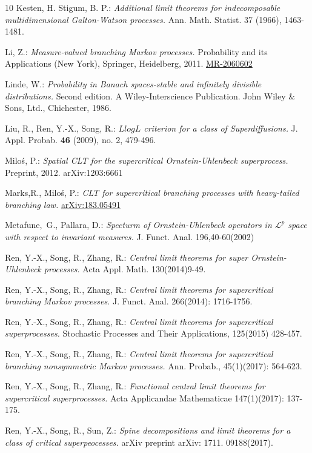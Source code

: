 \documentclass[12pt,a4paper]{amsart}
\def\MR#1{\href{http://www.ams.org/mathscinet-getitem?mr=#1}{MR-#1}}
\def\ARXIV#1{\href{https://arxiv.org/abs/#1}{arXiv:#1}}
\theoremstyle{plain}
\theoremstyle{definition}
\numberwithin{equation}{section}
\begin{document}
\begin{thebibliography} {10}
Kesten, H. Stigum, B. P.:
\emph{Additional limit theorems for indecomposable multidimensional Galton-Watson processes.}
Ann. Math. Statist. 37 (1966), 1463-1481.

Li, Z.:
\emph{Measure-valued branching Markov processes.}
Probability and its Applications (New York), Springer, Heidelberg, 2011.
\MR{2060602}

Linde, W.:
\emph{Probability in Banach spaces-stable and infinitely divisible distributions.}
Second edition. A Wiley-Interscience Publication. John Wiley \& Sons, Ltd., Chichester, 1986.

Liu, R., Ren, Y.-X., Song, R.:
\emph{{$L log L$} criterion for a class of Superdiffusions.}
J. Appl. Probab. \textbf{46} (2009), no. 2, 479-496.

Milo\'s, P.:
\emph{Spatial CLT for the supercritical Ornstein-Uhlenbeck superprocess.}
Preprint, 2012. arXiv:1203:6661

Marks,R., Milo\'s, P.:
\emph{CLT for supercritical branching processes with heavy-tailed branching law.}
\ARXIV{183.05491}

Metafune,~G., Pallara, D.:
\emph{Specturm of Ornstein-Uhlenbeck operators in $\mathcal{L}^p$ space with respect to invariant measures.}
J. Funct. Anal. 196,40-60(2002)

Ren, Y.-X., Song, R., Zhang, R.:
\emph{Central limit theorems for super Ornstein-Uhlenbeck processes.}
Acta Appl. Math. 130(2014)9-49.

Ren, Y.-X., Song, R., Zhang, R.:
\emph{Central limit theorems for supercritical branching Markov processes.}
J. Funct. Anal. 266(2014): 1716-1756.

Ren, Y.-X., Song, R., Zhang, R.:
\emph{Central limit theorems for supercritical superprocesses.}
Stochastic Processes and Their Applications, 125(2015) 428-457.

Ren, Y.-X., Song, R., Zhang, R.:
\emph{Central limit theorems for supercritical branching nonsymmetric Markov processes.}
Ann. Probab., 45(1)(2017): 564-623.

Ren, Y.-X., Song, R., Zhang, R.:
\emph{Functional central limit theorems for supercritical superprocesses.}
Acta Applicandae Mathematicae 147(1)(2017): 137-175.

Ren, Y.-X., Song, R., Sun, Z.:
\emph{ Spine decompositions and limit theorems for a class of critical superpeocesses.}
arXiv preprint arXiv: 1711. 09188(2017).


\end{thebibliography}
\end{document}
